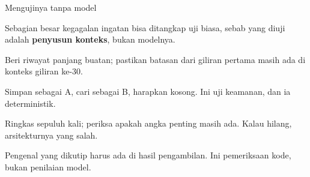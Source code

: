 \documentclass[aspectratio=169,11pt,t]{beamer}
\begin{document}
\begin{frame}[shrink=25]{Mengujinya tanpa model}
{\fontsize{9.4}{12.6}\selectfont\color{fg2}Sebagian besar kegagalan ingatan bisa ditangkap uji biasa, sebab yang diuji adalah \textbf{penyusun konteks}, bukan modelnya.\par}\vskip 4pt
\begin{minipage}[t]{0.494\textwidth}
\begin{icardgood}
Beri riwayat panjang buatan; pastikan batasan dari giliran pertama masih ada di konteks giliran ke-30.
\end{icardgood}
\end{minipage}%
\hfill
\begin{minipage}[t]{0.494\textwidth}
\begin{icardgood}
Simpan sebagai A, cari sebagai B, harapkan kosong. Ini uji keamanan, dan ia deterministik.
\end{icardgood}
\end{minipage}%


\vskip 4pt

\begin{minipage}[t]{0.494\textwidth}
\begin{icard}
Ringkas sepuluh kali; periksa apakah angka penting masih ada. Kalau hilang, arsitekturnya yang salah.
\end{icard}
\end{minipage}%
\hfill
\begin{minipage}[t]{0.494\textwidth}
\begin{icard}
Pengenal yang dikutip harus ada di hasil pengambilan. Ini pemeriksaan kode, bukan penilaian model.
\end{icard}
\end{minipage}%
\end{frame}
\end{document}
